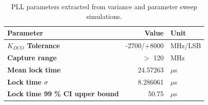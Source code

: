 \begin{table}[h!]
	\centering
	\def\arraystretch{1.5}		
	\setlength\arrayrulewidth{0.75pt}
	\setlength{\tabcolsep}{1em} %
	\begin{tabular}{|l|r|l|}
		\hline 
		\rule[-1ex]{0pt}{2.5ex} \cellcolor{gray!40}\textbf{Parameter} & \cellcolor{gray!40}\textbf{Value} & \cellcolor{gray!40}\textbf{Unit }\\ 
		\hline 
		\rule[-1ex]{0pt}{2.5ex} \textbf{$K_{DCO}$ Tolerance}  & -2700/+8000 & MHz/LSB \\ 
		\hline 
		\rule[-1ex]{0pt}{2.5ex} \textbf{Capture range}  & $>$ 120 & MHz \\ 
		\hline 
		\rule[-1ex]{0pt}{2.5ex} \textbf{Mean lock time}  & 24.57263 & $\mu$s \\ 
		\hline 
		\rule[-1ex]{0pt}{2.5ex} \textbf{Lock time $\sigma$} & 8.286061 & $\mu$s\\ 
		\hline 
		\rule[-1ex]{0pt}{2.5ex} \textbf{Lock time 99 \% CI upper bound} & 50.75  & $\mu$s\\ 
		\hline 
	\end{tabular} 
	\caption{PLL parameters extracted from variance and parameter sweep simulations.}
	\label{simulation_params}
\end{table}





\FloatBarrier

